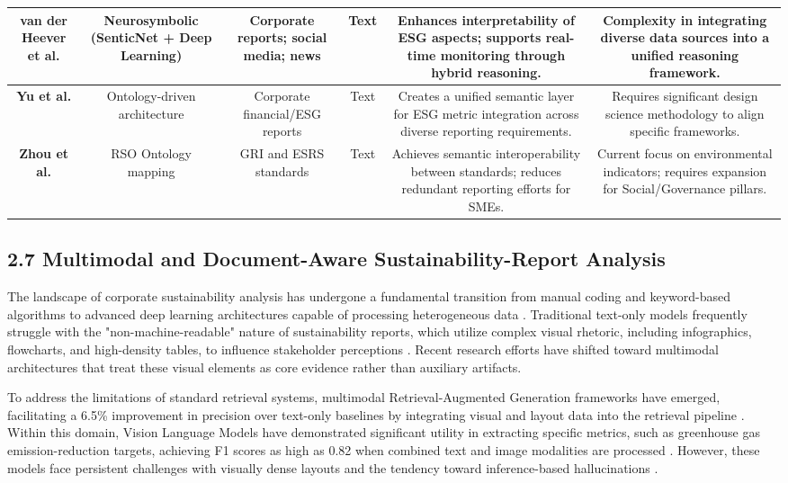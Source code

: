 \documentclass{article}
\begin{document}
\begin{table}[h!]
\begin{tabular}{|c|c|c|c|c|c|}
\textbf{van der Heever et al. } \parencite{wihan_van_der_heever_5ff35709} & Neurosymbolic (SenticNet + Deep Learning) & Corporate reports; social media; news & Text & Enhances interpretability of ESG aspects; supports real-time monitoring through hybrid reasoning. & Complexity in integrating diverse data sources into a unified reasoning framework. \\ \hline
\textbf{Yu et al. } \parencite{mingqin_yu_96a5b8af} & Ontology-driven architecture & Corporate financial/ESG reports & Text & Creates a unified semantic layer for ESG metric integration across diverse reporting requirements. & Requires significant design science methodology to align specific frameworks. \\ \hline
\textbf{Zhou et al. } \parencite{yuchen_zhou_b6beee03} & RSO Ontology mapping & GRI and ESRS standards & Text & Achieves semantic interoperability between standards; reduces redundant reporting efforts for SMEs. & Current focus on environmental indicators; requires expansion for Social/Governance pillars. \\ \hline
\end{tabular}
\end{table}
\subsection{2.7 Multimodal and Document-Aware Sustainability-Report Analysis}

The landscape of corporate sustainability analysis has undergone a fundamental transition from manual coding and keyword-based algorithms to advanced deep learning architectures capable of processing heterogeneous data  \parencite{sarah_chepkogei_sawe_a4abd9c5}. Traditional text-only models frequently struggle with the "non-machine-readable" nature of sustainability reports, which utilize complex visual rhetoric, including infographics, flowcharts, and high-density tables, to influence stakeholder perceptions  \parencite[]{bingjie_li_487d69fd, tanay_gupta_aafe0c6a}. Recent research efforts have shifted toward multimodal architectures that treat these visual elements as core evidence rather than auxiliary artifacts.

To address the limitations of standard retrieval systems, multimodal Retrieval-Augmented Generation frameworks have emerged, facilitating a 6.5\% improvement in precision over text-only baselines by integrating visual and layout data into the retrieval pipeline  \parencite{g_saipooja_m_n_488bfdd6}. Within this domain, Vision Language Models have demonstrated significant utility in extracting specific metrics, such as greenhouse gas emission-reduction targets, achieving F1 scores as high as 0.82 when combined text and image modalities are processed  \parencite{lars_wilhelmi_8d7e860b}. However, these models face persistent challenges with visually dense layouts and the tendency toward inference-based hallucinations  \parencite{lars_wilhelmi_8d7e860b}.
\end{document}
